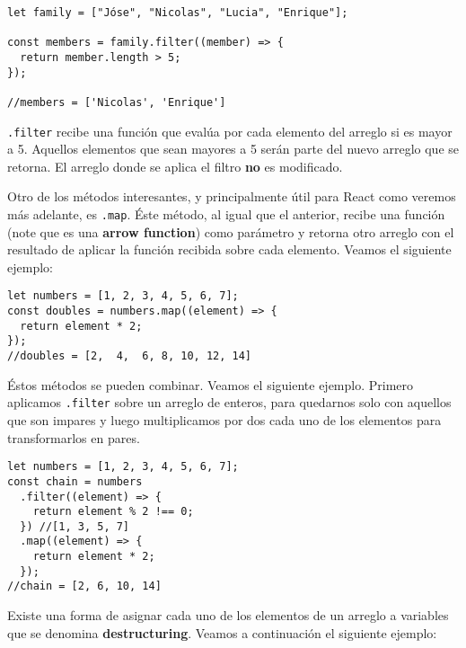 \documentclass[a4paper, oneside, titlepage, 12pt]{paper}
\begin{document}
\begin{verbatim}
let family = ["Jóse", "Nicolas", "Lucia", "Enrique"];

const members = family.filter((member) => {
  return member.length > 5;
});

//members = ['Nicolas', 'Enrique']
\end{verbatim}

\texttt{.filter} recibe una función que evalúa por cada elemento del arreglo si es mayor a 5. Aquellos elementos que sean mayores a 5 serán parte del nuevo arreglo que se retorna. El arreglo donde se aplica el filtro \textbf{no} es modificado.

Otro de los métodos interesantes, y principalmente útil para React como veremos más adelante, es \texttt{.map}. Éste método, al igual que el anterior, recibe una función (note que es una \textbf{arrow function}) como parámetro y retorna otro arreglo con el resultado de aplicar la función recibida sobre cada elemento. Veamos el siguiente ejemplo:

\begin{verbatim}
let numbers = [1, 2, 3, 4, 5, 6, 7];
const doubles = numbers.map((element) => {
  return element * 2;
});
//doubles = [2,  4,  6, 8, 10, 12, 14]
\end{verbatim}

Éstos métodos se pueden combinar. Veamos el siguiente ejemplo. Primero aplicamos \texttt{.filter} sobre un arreglo de enteros, para quedarnos solo con aquellos que son impares y luego multiplicamos por dos cada uno de los elementos para transformarlos en pares. 

\begin{verbatim}
let numbers = [1, 2, 3, 4, 5, 6, 7];
const chain = numbers
  .filter((element) => {
    return element % 2 !== 0;
  }) //[1, 3, 5, 7]
  .map((element) => {
    return element * 2;
  });
//chain = [2, 6, 10, 14]
\end{verbatim}

Existe una forma de asignar cada uno de los elementos de un arreglo a variables que se denomina \textbf{destructuring}. Veamos a continuación el siguiente ejemplo:
\end{document}
